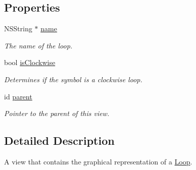 \subsection*{Properties}
\begin{DoxyCompactItemize}
\item 
\hypertarget{interface_loop_view_a4b93d352d2fca75b34e1b5a50e03f587}{N\-S\-String $\ast$ \hyperlink{interface_loop_view_a4b93d352d2fca75b34e1b5a50e03f587}{name}}\label{interface_loop_view_a4b93d352d2fca75b34e1b5a50e03f587}

\begin{DoxyCompactList}\small\item\em The name of the loop. \end{DoxyCompactList}\item 
\hypertarget{interface_loop_view_a0df1d66872ef90fe830b9118e0c76202}{bool \hyperlink{interface_loop_view_a0df1d66872ef90fe830b9118e0c76202}{is\-Clockwise}}\label{interface_loop_view_a0df1d66872ef90fe830b9118e0c76202}

\begin{DoxyCompactList}\small\item\em Determines if the symbol is a clockwise loop. \end{DoxyCompactList}\item 
\hypertarget{interface_loop_view_a4376b99467d16ed71554a4a6ddd4ae0a}{id \hyperlink{interface_loop_view_a4376b99467d16ed71554a4a6ddd4ae0a}{parent}}\label{interface_loop_view_a4376b99467d16ed71554a4a6ddd4ae0a}

\begin{DoxyCompactList}\small\item\em Pointer to the parent of this view. \end{DoxyCompactList}\end{DoxyCompactItemize}


\subsection{Detailed Description}
A view that contains the graphical representation of a \hyperlink{interface_loop}{Loop}. 

